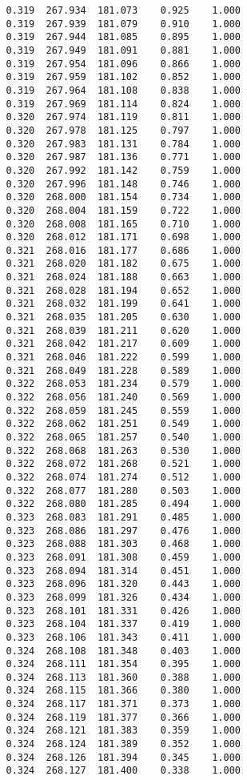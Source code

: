 \begin{verbatim}
   0.319  267.934  181.073    0.925    1.000
   0.319  267.939  181.079    0.910    1.000
   0.319  267.944  181.085    0.895    1.000
   0.319  267.949  181.091    0.881    1.000
   0.319  267.954  181.096    0.866    1.000
   0.319  267.959  181.102    0.852    1.000
   0.319  267.964  181.108    0.838    1.000
   0.319  267.969  181.114    0.824    1.000
   0.320  267.974  181.119    0.811    1.000
   0.320  267.978  181.125    0.797    1.000
   0.320  267.983  181.131    0.784    1.000
   0.320  267.987  181.136    0.771    1.000
   0.320  267.992  181.142    0.759    1.000
   0.320  267.996  181.148    0.746    1.000
   0.320  268.000  181.154    0.734    1.000
   0.320  268.004  181.159    0.722    1.000
   0.320  268.008  181.165    0.710    1.000
   0.320  268.012  181.171    0.698    1.000
   0.321  268.016  181.177    0.686    1.000
   0.321  268.020  181.182    0.675    1.000
   0.321  268.024  181.188    0.663    1.000
   0.321  268.028  181.194    0.652    1.000
   0.321  268.032  181.199    0.641    1.000
   0.321  268.035  181.205    0.630    1.000
   0.321  268.039  181.211    0.620    1.000
   0.321  268.042  181.217    0.609    1.000
   0.321  268.046  181.222    0.599    1.000
   0.321  268.049  181.228    0.589    1.000
   0.322  268.053  181.234    0.579    1.000
   0.322  268.056  181.240    0.569    1.000
   0.322  268.059  181.245    0.559    1.000
   0.322  268.062  181.251    0.549    1.000
   0.322  268.065  181.257    0.540    1.000
   0.322  268.068  181.263    0.530    1.000
   0.322  268.072  181.268    0.521    1.000
   0.322  268.074  181.274    0.512    1.000
   0.322  268.077  181.280    0.503    1.000
   0.322  268.080  181.285    0.494    1.000
   0.323  268.083  181.291    0.485    1.000
   0.323  268.086  181.297    0.476    1.000
   0.323  268.088  181.303    0.468    1.000
   0.323  268.091  181.308    0.459    1.000
   0.323  268.094  181.314    0.451    1.000
   0.323  268.096  181.320    0.443    1.000
   0.323  268.099  181.326    0.434    1.000
   0.323  268.101  181.331    0.426    1.000
   0.323  268.104  181.337    0.419    1.000
   0.323  268.106  181.343    0.411    1.000
   0.324  268.108  181.348    0.403    1.000
   0.324  268.111  181.354    0.395    1.000
   0.324  268.113  181.360    0.388    1.000
   0.324  268.115  181.366    0.380    1.000
   0.324  268.117  181.371    0.373    1.000
   0.324  268.119  181.377    0.366    1.000
   0.324  268.121  181.383    0.359    1.000
   0.324  268.124  181.389    0.352    1.000
   0.324  268.126  181.394    0.345    1.000
   0.324  268.127  181.400    0.338    1.000

\end{verbatim}
